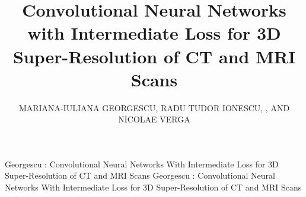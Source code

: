 \documentclass{ieeeaccess}
\begin{document}

\title{Convolutional Neural Networks with Intermediate Loss for 3D Super-Resolution of CT and MRI Scans}
\author{\uppercase{Mariana-Iuliana Georgescu}, \uppercase{{Radu Tudor} Ionescu,
, and Nicolae Verga}}
\address[1]{University of Bucharest, Bucharest, Romania}
\address[2]{``Carol Davila'' University of Medicine and Pharmacy, Bucharest, Romania}
\address[3]{Colțea Hospital, Bucharest, Romania}

\markboth
{Georgescu \headeretal: Convolutional Neural Networks With Intermediate Loss for 3D Super-Resolution of CT and MRI Scans}
{Georgescu \headeretal: Convolutional Neural Networks With Intermediate Loss for 3D Super-Resolution of CT and MRI Scans}

\end{document}
